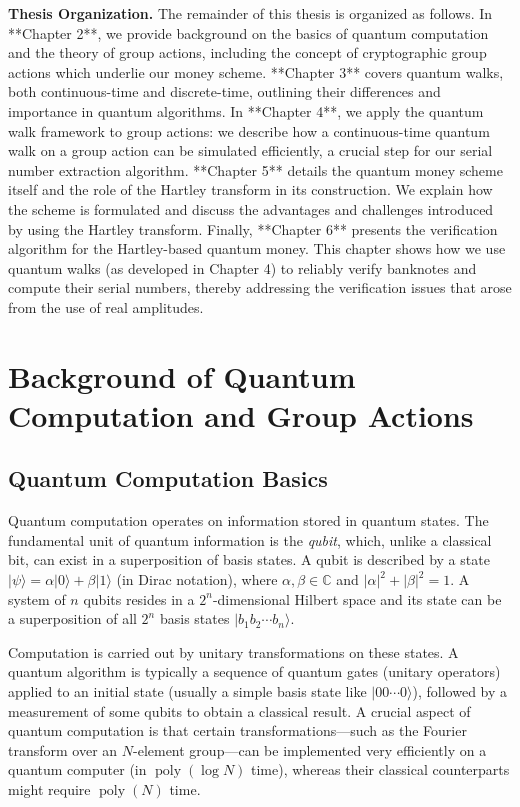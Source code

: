 \documentclass[12pt]{report}
\begin{document}
\medskip\noindent\textbf{Thesis Organization.} 
The remainder of this thesis is organized as follows. In **Chapter 2**, we provide background on the basics of quantum computation and the theory of group actions, including the concept of cryptographic group actions which underlie our money scheme. **Chapter 3** covers quantum walks, both continuous-time and discrete-time, outlining their differences and importance in quantum algorithms. In **Chapter 4**, we apply the quantum walk framework to group actions: we describe how a continuous-time quantum walk on a group action can be simulated efficiently, a crucial step for our serial number extraction algorithm. **Chapter 5** details the quantum money scheme itself and the role of the Hartley transform in its construction. We explain how the scheme is formulated and discuss the advantages and challenges introduced by using the Hartley transform. Finally, **Chapter 6** presents the verification algorithm for the Hartley-based quantum money. This chapter shows how we use quantum walks (as developed in Chapter 4) to reliably verify banknotes and compute their serial numbers, thereby addressing the verification issues that arose from the use of real amplitudes.
\vspace{1em}



\chapter{Background of Quantum Computation and Group Actions}

\section{Quantum Computation Basics}

Quantum computation operates on information stored in quantum states. The fundamental unit of quantum information is the \emph{qubit}, which, unlike a classical bit, can exist in a superposition of basis states. A qubit is described by a state $|\psi\rangle = \alpha |0\rangle + \beta |1\rangle$ (in Dirac notation), where $\alpha,\beta \in \mathbb{C}$ and $|\alpha|^2 + |\beta|^2 = 1$. A system of $n$ qubits resides in a $2^n$-dimensional Hilbert space and its state can be a superposition of all $2^n$ basis states $|b_1b_2\cdots b_n\rangle$. 

Computation is carried out by unitary transformations on these states. A quantum algorithm is typically a sequence of quantum gates (unitary operators) applied to an initial state (usually a simple basis state like $|00\cdots0\rangle$), followed by a measurement of some qubits to obtain a classical result. A crucial aspect of quantum computation is that certain transformations—such as the Fourier transform over an $N$-element group—can be implemented very efficiently on a quantum computer (in $\operatorname{poly}(\log N)$ time), whereas their classical counterparts might require $\operatorname{poly}(N)$ time.
\end{document}

